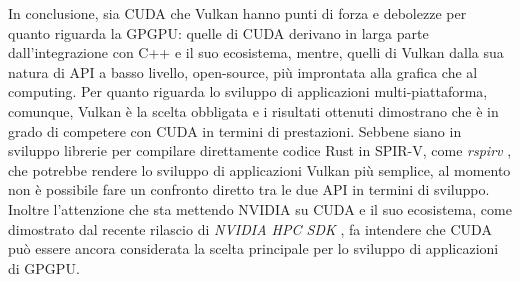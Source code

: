 
In conclusione, sia \gls{CUDA} che Vulkan hanno punti di forza e debolezze per quanto riguarda la \gls{GPGPU}: quelle di \gls{CUDA} derivano in larga parte dall'integrazione con C++ e il suo ecosistema, mentre, quelli di Vulkan dalla sua natura di \gls{API} a basso livello, open-source, più improntata alla grafica che al computing. Per quanto riguarda lo sviluppo di applicazioni multi-piattaforma, comunque, Vulkan è la scelta obbligata e i risultati ottenuti dimostrano che è in grado di competere con \gls{CUDA} in termini di prestazioni. Sebbene siano in sviluppo librerie per compilare direttamente codice Rust in \gls{SPIR-V}, come \textit{rspirv} \cite[]{KG:rspirv}, che potrebbe rendere lo sviluppo di applicazioni Vulkan più semplice, al momento non è possibile fare un confronto diretto tra le due \gls{API} in termini di sviluppo. Inoltre l'attenzione che sta mettendo NVIDIA su \gls{CUDA} e il suo ecosistema, come dimostrato dal recente rilascio di \textit{NVIDIA HPC SDK} \cite[]{NVIDIA:hpc_sdk}, fa intendere che \gls{CUDA} può essere ancora considerata la scelta principale per lo sviluppo di applicazioni di \gls{GPGPU}.

